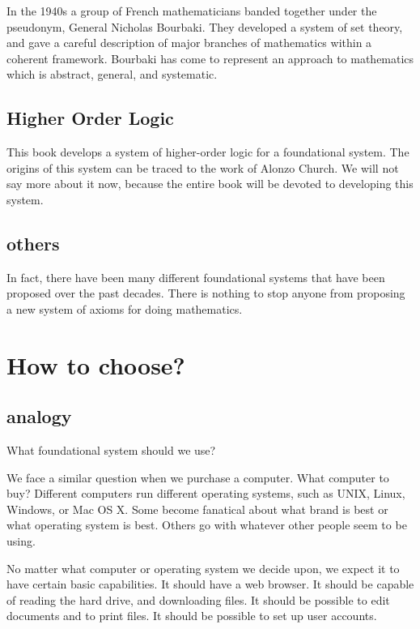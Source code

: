 In the 1940s a group of French mathematicians banded together under the pseudonym, General Nicholas Bourbaki.  They developed a system of set theory, and gave a careful description of major branches of mathematics within a coherent framework.  Bourbaki has come to represent an approach to mathematics which is abstract, general, and systematic.

\subsection{Higher Order Logic}

This book develops a system of higher-order logic for a foundational system.  The origins of this system can be traced to the work of Alonzo Church.  We will not say more about it now, because the entire book will be devoted to developing this system.

\subsection{others}


In fact, there have been many different foundational systems that have been proposed over the past decades.  There is nothing to stop anyone from proposing a new system of axioms for doing mathematics.


\section{How to choose?}

\subsection{analogy}

What foundational system should we use?

We face a similar question when we purchase a computer.  What computer to buy?  Different computers run different operating systems, such as UNIX, Linux, Windows, or Mac OS X.  Some become fanatical about what brand is best or what operating system is best.  Others go with whatever other people seem to be using.

No matter what computer or operating system we decide upon, we expect it to have certain basic capabilities.  It should have a web browser.  It should be capable of reading the hard drive, and downloading files.  It should be possible to edit documents and to print files.  It should be possible to set up user accounts.

